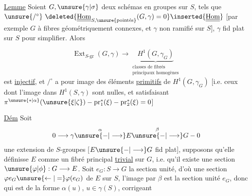 \uline{Lemme} Soient $G,\unsure{\gamma|\sigma}$ deux schémas en groupes  sur $S$, tels que $\unsure{/^{\circ}}\ \deleted{\underline{\underline{\operatorname{Hom}}}_{S,\unsure{\text{pointés}}}(G,\gamma)=0}\inserted{\underline{\underline{\operatorname{Hom}}}}$ [par exemple $G$ à fibres géométriquement connexes, et $\gamma$ non ramifié sur $S$], $\gamma$ fid plat sur $S$ pour simplifier. Alors

\[
\operatorname{Ext}_{S\text{-gr}}(G,\gamma)\longrightarrow\underbrace{H^1(G,\gamma_G)}_{\substack{\text{classes de fibrés}\\\text{principaux homogènes}}}\tag*{(*)}
\]
est \uline{injectif}, et $/^{\circ}$ a pour image  des éléments \uline{primitifs} de $H^1(G,\gamma_G)$ [i.e. ceux dont l'image dans $H^1(S,\gamma)$ sont nulles, et satisfaisant $\pi^{\unsure{*|\alpha}}(\unsure{\xi|\zeta})-\operatorname{pr}_1^*(\xi)-\operatorname{pr}_2^*(\xi)=0$]


\uline{Dém} Soit
\[
0\longrightarrow\gamma\overset{\alpha}{\unsure{-|\longrightarrow}}E\overset{\beta}{\unsure{-|\longrightarrow}}G-0
\]
une extension de $S$-groupes [$E\unsure{-|\longrightarrow}G$ fid plat], supposons qu'elle définisse $E$ comme un fibré principal \uline{trivial} sur $G$, i.e. qu'il existe une section $\unsure{\varphi|\phi}:G\longrightarrow E$. Soit $e_G:S\longrightarrow G$ la section unité, d'où une section $\varphi e_G\unsure{\leftarrow|=}\varphi(e_G)$ de $E$ sur $S$,  l'image par $\beta$ est la section unité $e_G$, donc qui est de la forme $\alpha(u)$, $u\in\gamma(S)$, corrigeant
